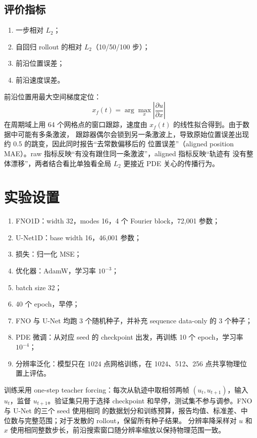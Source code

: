 \documentclass[a4paper,11pt,fontset=windows]{ctexart}
\begin{document}
\subsection{评价指标}

\begin{enumerate}
  \item 一步相对 $L_2$；
  \item 自回归 rollout 的相对 $L_2$（10/50/100 步）；
  \item 前沿位置误差；
  \item 前沿速度误差。
\end{enumerate}

前沿位置用最大空间梯度定位：
\begin{equation}
  x_f(t) = \arg\max_x \left|\frac{\partial u}{\partial x}\right|
\end{equation}
在周期域上用 64 个网格点的窗口跟踪，速度由 $x_f(t)$ 的线性拟合得到。由于数据中可能有多条激波，
跟踪器偶尔会锁到另一条激波上，导致原始位置误差出现约 0.5 的跳变，因此同时报告“去常数偏移后的
位置误差”（aligned position MAE）。raw 指标反映“有没有跟住同一条激波”，aligned 指标反映“轨迹有
没有整体漂移”，两者结合看比单独看全局 $L_2$ 更接近 PDE 关心的传播行为。

\section{实验设置}

\begin{enumerate}
  \item FNO1D：width 32，modes 16，4 个 Fourier block，72,001 参数；
  \item U-Net1D：base width 16，46,001 参数；
  \item 损失：归一化 MSE；
  \item 优化器：AdamW，学习率 $10^{-3}$；
  \item batch size 32；
  \item 40 个 epoch，早停；
  \item FNO 与 U-Net 均跑 3 个随机种子，并补充 sequence data-only 的 3 个种子；
  \item PDE 微调：从对应 seed 的 checkpoint 出发，再训练 10 个 epoch，学习率 $10^{-4}$；
  \item 分辨率泛化：模型只在 1024 点网格训练，在 1024、512、256 点共享物理位置上评估。
\end{enumerate}

训练采用 one-step teacher forcing：每次从轨迹中取相邻两帧 $(u_t,u_{t+1})$，输入 $u_t$，监督
$u_{t+1}$。验证集只用于选择 checkpoint 和早停，测试集不参与调参。FNO 与 U-Net 的三个 seed 使用相同
的数据划分和训练预算，报告均值、标准差、中位数与完整范围；对于发散的 rollout，保留所有种子结果。
分辨率降采样对 $u$ 和 $x$ 使用相同整数步长，前沿搜索窗口随分辨率缩放以保持物理范围一致。
\end{document}
